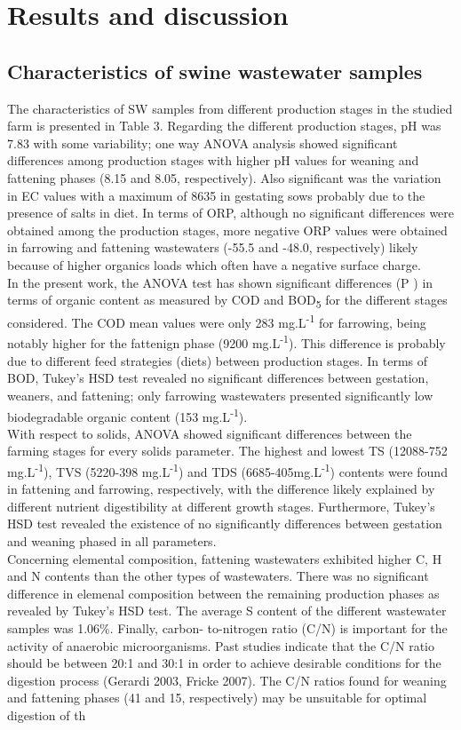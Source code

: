 \section{Results and discussion}
\subsection{Characteristics of swine wastewater samples}
The characteristics of SW samples from different production stages in the studied farm is presented in Table 3. Regarding the different production stages, pH was 7.83 with some variability; one way ANOVA analysis showed significant differences among production stages with higher pH values for weaning and fattening phases (8.15 and 8.05, respectively). Also significant was the variation in EC values with a maximum of 8635 in gestating sows probably due to the presence of salts in diet. In terms of ORP, although no significant differences were obtained among the production stages, more negative ORP values were obtained in farrowing and fattening wastewaters (-55.5 and -48.0, respectively) likely because of higher organics loads which often have a negative surface charge.\\
In the present work, the ANOVA test has shown significant differences (P ) in terms of organic content as measured by COD and BOD\textsubscript{5} for the different stages considered. The COD mean values were only 283 mg.L\textsuperscript{-1} for farrowing, being notably higher for the fattenign phase (9200 mg.L\textsuperscript{-1}). This difference is probably due to different feed strategies (diets) between production stages. In terms of BOD, Tukey’s HSD test revealed no significant differences between gestation, weaners, and fattening; only farrowing wastewaters presented significantly low biodegradable organic content (153 mg.L\textsuperscript{-1}).\\
With respect to solids, ANOVA showed significant differences between the farming stages for every solids parameter. The highest and lowest TS (12088-752 mg.L\textsuperscript{-1}), TVS (5220-398 mg.L\textsuperscript{-1}) and TDS (6685-405mg.L\textsuperscript{-1}) contents were found in fattening and farrowing, respectively, with the difference likely explained by different nutrient digestibility at different growth stages. Furthermore, Tukey’s HSD test revealed the existence of no significantly differences between gestation and weaning phased in all parameters.\\
Concerning elemental composition, fattening wastewaters exhibited higher C, H and N contents than the other types of wastewaters. There was no significant difference in elemenal composition between the remaining production phases as revealed by Tukey's HSD test. The average S content of the different wastewater samples was 1.06\%. Finally, carbon- to-nitrogen ratio (C/N) is important for the activity of anaerobic microorganisms. Past studies indicate that the C/N ratio should be between 20:1 and 30:1 in order to achieve desirable conditions for the digestion process (Gerardi 2003, Fricke 2007). The C/N ratios found for weaning and fattening phases (41 and 15, respectively) may be unsuitable for optimal digestion of th